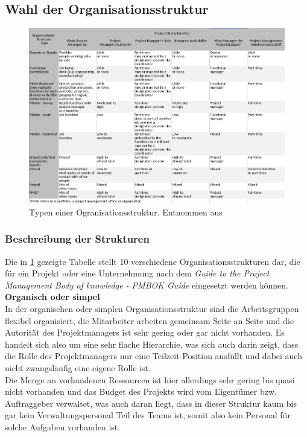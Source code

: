 \documentclass[ThesisDJ.tex]{subfiles}
\begin{document}
  \subsection{Wahl der Organisationsstruktur}

\begin{figure}[ht]
    \hspace{-0.5cm}
    \includegraphics[width=40pc]{./Organisationsstrukturen.png}
    \caption{Typen einer Ogranisationsstruktur. Entnommen aus\cite[S.~75]{PMI2017PMBOK}}
    \label{fig:orgstrukturen}
\end{figure} 

\subsubsection{Beschreibung der Strukturen}

Die in \ref{fig:orgstrukturen} gezeigte Tabelle stellt 10 verschiedene Organisationsstrukturen dar, die für ein Projekt oder eine Unternehmung nach dem \emph{Guide to the Project Management Body of knowledge - PMBOK Guide} eingesetzt werden können.\cite{PMI2017PMBOK} \smallskip\\

\textbf{Organisch oder simpel}\\
In der organischen oder simplen Organisationsstruktur sind die Arbeitsgruppen flexibel organisiert, die Mitarbeiter arbeiten gemeinsam Seite an Seite und die Autorität des Projektmanagers ist sehr gering oder gar nicht vorhanden. Es handelt sich also um eine sehr flache Hierarchie, was sich auch darin zeigt, dass die Rolle des Projektmanagers nur eine Teilzeit-Position ausfüllt und dabei auch nicht zwangsläufig eine eigene Rolle ist.\\
Die Menge an vorhandenen Ressourcen ist hier allerdings sehr gering bis quasi nicht vorhanden und das Budget des Projekts wird vom Eigentümer bzw. Auftraggeber verwaltet, was auch daran liegt, dass in dieser Struktur kaum bis gar kein Verwaltungspersonal Teil des Teams ist, somit also kein Personal für solche Aufgaben vorhanden ist. \medskip\\
\end{document}

